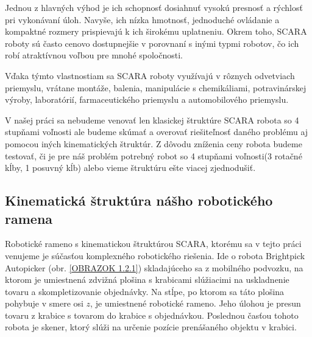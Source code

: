 Jednou z hlavných výhod je ich schopnosť dosiahnuť vysokú presnosť a rýchlosť pri vykonávaní úloh. Navyše, ich nízka hmotnosť, jednoduché ovládanie a kompaktné rozmery prispievajú k ich širokému uplatneniu. Okrem toho, SCARA roboty sú často cenovo dostupnejšie v porovnaní s inými typmi robotov, čo ich robí atraktívnou voľbou pre mnohé spoločnosti.

Vďaka týmto vlastnostiam sa SCARA roboty využívajú v rôznych odvetviach priemyslu, vrátane montáže, balenia, manipulácie s chemikáliami, potravinárskej výroby, laboratórií, farmaceutického priemyslu a automobilového priemyslu.

V našej práci sa nebudeme venovať len klasickej štruktúre SCARA robota so 4 stupňami voľnosti ale budeme skúmať a overovať riešiteľnosť daného problému aj pomocou iných kinematických štruktúr. 
Z dôvodu zníženia ceny robota budeme  testovať, či je pre náš problém potrebný robot so 4 stupňami voľnosti(3 rotačné kĺby, 1 posuvný kĺb) alebo vieme štruktúru ešte viacej zjednodušiť.



\subsection{Kinematická štruktúra nášho robotického ramena}
\label{kap:1.2}

Robotické rameno s kinematickou štruktúrou SCARA, ktorému sa v tejto práci venujeme je súčasťou komplexného robotického riešenia. Ide o robota Brightpick Autopicker (obr. \ref{OBRAZOK 1.2.1}) skladajúceho sa z mobilného podvozku, na ktorom je umiestnená zdvižná plošina s krabicami slúžiacimi na uskladnenie tovaru a skompletizovanie objednávky. Na stĺpe, po ktorom sa táto plošina pohybuje v smere osi $z$, je umiestnené robotické rameno. Jeho úlohou je presun tovaru z krabice s tovarom do krabice s objednávkou. Poslednou časťou tohoto robota je skener, ktorý slúži na určenie pozície prenášaného objektu v krabici.

